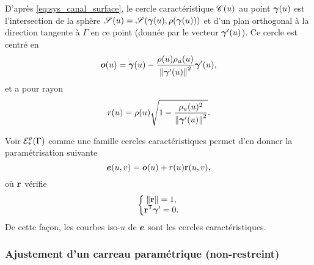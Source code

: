 \par
D'après \eqref{eq:sys_canal_surface}, le cercle caractéristique $\mathscr{C}(u)$ au point $\bm{\gamma}(u)$ est l'intersection de la sphère $\sphere[u] = \sphere[\bg(u)][\rho(\bg(u))]$ et d'un plan orthogonal à la direction tangente à $\Gamma$ en ce point (donnée par le vecteur $\bm{\gamma}'(u)$). 
Ce cercle est centré en
\begin{equation}
    \bm{o}(u) = \bm{\gamma}(u) - \frac{\rho(u)\rho_u(u)}{\left\| {\bm{\gamma}'(u)} \right\|^2} \bm{\gamma}'(u),
    \label{eq:cercle_caracteristique_centre}
\end{equation}
et a pour rayon
\begin{equation}
    r(u) = \rho(u) \sqrt{1 - \frac{\rho_u(u)^2}{\left\| {\bm{\gamma}'(u)} \right\|^2}}.
    \label{eq:cercle_caracteristique_rayon}
\end{equation}
\par
Voir ${\mathcal{E}}_{*}^{\rho}({\Gamma})$ comme une famille cercles caractéristiques permet d'en donner la paramétrisation suivante
\begin{equation}
    \bm{e}(u,v) = \bm{o}(u) + r(u)\mathbf{r}(u,v),
    \label{eq:parametrisation_EdS_propre_courbe}
\end{equation}
où $\mathbf{r}$ vérifie
\begin{equation}
	\left\{
		\begin{matrix}
			\left\| {\mathbf{r}} \right\| = 1,\\ 
			{\mathbf{r}} ^\mathsf{T} {\bm{\gamma}'} = 0.
		\end{matrix}
	\right.
	\label{eq:parametrisation_EdS_propre_courbe_condition_r}
\end{equation}
De cette façon, les courbes iso-$u$ de $\bm{e}$ sont les cercles caractéristiques.


\subsubsection{Ajustement d'un carreau paramétrique (non-restreint)}
\label{section:parametrisation_pseudo_EdS_arete}



